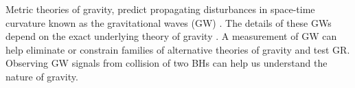 Metric theories of gravity, predict propagating disturbances in space-time curvature known as the gravitational waves (GW) \cite{kipGWGR}. The details of these GWs depend on the exact underlying theory of gravity \cite{ReviewAlternativeTheories1}.  A measurement of GW can help eliminate or constrain families of alternative theories of gravity and test GR. Observing GW signals from collision of two BHs \cite{CBCGW1, CBCGW2} can help us understand the nature of gravity.



     


